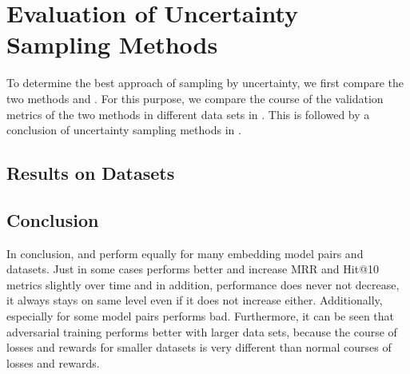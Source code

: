 \section{Evaluation of Uncertainty Sampling Methods}
\label{ch:evaluation:sec:evaluation_methods}
%
To determine the best approach of sampling by uncertainty, we first compare the two methods \usmax and \ussoftmax.
For this purpose, we compare the course of the validation metrics of the two methods in different data sets in .
This is followed by a conclusion of uncertainty sampling methods in  .
%
\subsection{Results on Datasets} \label{subsec:methods_results}




%
\subsection{Conclusion} 
\label{subsec:methods_conclusion}
%
In conclusion, \usmax and \ussoftmax perform equally for many embedding model pairs and datasets.
Just in some cases \ussoftmax performs better and increase MRR and Hit@10 metrics slightly over time and in addition, performance does never not decrease, it always stays on same level even if it does not increase either.
Additionally, especially for some model pairs \usmax performs bad.
Furthermore, it can be seen that adversarial training performs better with larger data sets, because the course of losses and rewards for smaller datasets is very different than normal courses of losses and rewards.

